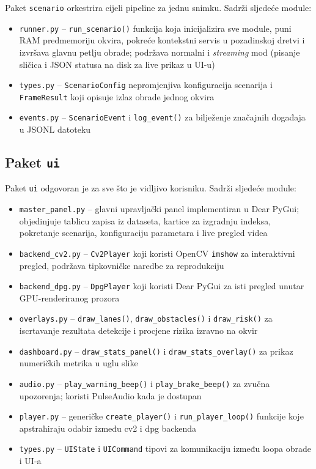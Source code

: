 Paket \texttt{scenario} orkestrira cijeli pipeline za jednu snimku. Sadrži sljedeće module:

\begin{itemize}
    \item \texttt{runner.py} -- \texttt{run\_scenario()} funkcija koja inicijalizira sve module, puni RAM predmemoriju okvira, pokreće kontekstni servis u pozadinskoj dretvi i izvršava glavnu petlju obrade; podržava normalni i \textit{streaming} mod (pisanje sličica i JSON statusa na disk za live prikaz u UI-u)
    \item \texttt{types.py} -- \texttt{ScenarioConfig} nepromjenjiva konfiguracija scenarija i \texttt{FrameResult} koji opisuje izlaz obrade jednog okvira
    \item \texttt{events.py} -- \texttt{ScenarioEvent} i \texttt{log\_event()} za bilježenje značajnih događaja u JSONL datoteku
\end{itemize}

\subsection{Paket \texttt{ui}}

Paket \texttt{ui} odgovoran je za sve što je vidljivo korisniku. Sadrži sljedeće module:

\begin{itemize}
    \item \texttt{master\_panel.py} -- glavni upravljački panel implementiran u Dear PyGui; objedinjuje tablicu zapisa iz dataseta, kartice za izgradnju indeksa, pokretanje scenarija, konfiguraciju parametara i live pregled videa
    \item \texttt{backend\_cv2.py} -- \texttt{Cv2Player} koji koristi OpenCV \texttt{imshow} za interaktivni pregled, podržava tipkovničke naredbe za reprodukciju
    \item \texttt{backend\_dpg.py} -- \texttt{DpgPlayer} koji koristi Dear PyGui za isti pregled unutar GPU-renderiranog prozora
    \item \texttt{overlays.py} -- \texttt{draw\_lanes()}, \texttt{draw\_obstacles()} i \texttt{draw\_risk()} za iscrtavanje rezultata detekcije i procjene rizika izravno na okvir
    \item \texttt{dashboard.py} -- \texttt{draw\_stats\_panel()} i \texttt{draw\_stats\_overlay()} za prikaz numeričkih metrika u uglu slike
    \item \texttt{audio.py} -- \texttt{play\_warning\_beep()} i \texttt{play\_brake\_beep()} za zvučna upozorenja; koristi PulseAudio kada je dostupan
    \item \texttt{player.py} -- generičke \texttt{create\_player()} i \texttt{run\_player\_loop()} funkcije koje apstrahiraju odabir između cv2 i dpg backenda
    \item \texttt{types.py} -- \texttt{UIState} i \texttt{UICommand} tipovi za komunikaciju između loopa obrade i UI-a
\end{itemize}

